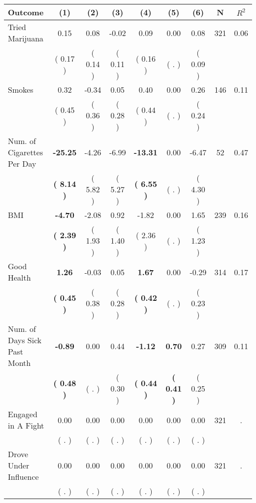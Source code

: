 \begin{tabular}{lcccccccc}
\toprule
 \textbf{Outcome} & \textbf{(1)} & \textbf{(2)} & \textbf{(3)} & \textbf{(4)} & \textbf{(5)} & \textbf{(6)} & \textbf{N} & \textbf{$ R^2$} \\
\midrule
Tried Marijuana &      0.15 &      0.08 &     -0.02 &      0.09 &      0.00 &      0.08 & 321 &       0.06 \\ 
 & (     0.17 ) & (     0.14 ) & (     0.11 ) & (     0.16 ) & (        . ) & (     0.09 ) & \\
Smokes &      0.32 &     -0.34 &      0.05 &      0.40 &      0.00 &      0.26 & 146 &       0.11 \\ 
 & (     0.45 ) & (     0.36 ) & (     0.28 ) & (     0.44 ) & (        . ) & (     0.24 ) & \\
Num. of Cigarettes Per Day & \textbf{   -25.25} &     -4.26 &     -6.99 & \textbf{   -13.31} &      0.00 &     -6.47 & 52 &       0.47 \\ 
 & \textbf{(     8.14 )} & (     5.82 ) & (     5.27 ) & \textbf{(     6.55 )} & (        . ) & (     4.30 ) & \\
BMI & \textbf{    -4.70} &     -2.08 &      0.92 &     -1.82 &      0.00 &      1.65 & 239 &       0.16 \\ 
 & \textbf{(     2.39 )} & (     1.93 ) & (     1.40 ) & (     2.36 ) & (        . ) & (     1.23 ) & \\
Good Health & \textbf{     1.26} &     -0.03 &      0.05 & \textbf{     1.67} &      0.00 &     -0.29 & 314 &       0.17 \\ 
 & \textbf{(     0.45 )} & (     0.38 ) & (     0.28 ) & \textbf{(     0.42 )} & (        . ) & (     0.23 ) & \\
Num. of Days Sick Past Month & \textbf{    -0.89} &      0.00 &      0.44 & \textbf{    -1.12} & \textbf{     0.70} &      0.27 & 309 &       0.11 \\ 
 & \textbf{(     0.48 )} & (        . ) & (     0.30 ) & \textbf{(     0.44 )} & \textbf{(     0.41 )} & (     0.25 ) & \\
Engaged in A Fight &      0.00 &      0.00 &      0.00 &      0.00 &      0.00 &      0.00 & 321 &          . \\ 
 & (        . ) & (        . ) & (        . ) & (        . ) & (        . ) & (        . ) & \\
Drove Under Influence &      0.00 &      0.00 &      0.00 &      0.00 &      0.00 &      0.00 & 321 &          . \\ 
 & (        . ) & (        . ) & (        . ) & (        . ) & (        . ) & (        . ) & \\

\end{tabular}
